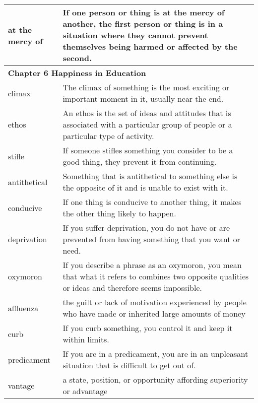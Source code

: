 \documentclass{article}
\begin{document}
\begin{center}
\begin{longtable}{|l|p{7.8cm}|}
\hline
at the mercy of
&
If one person or thing is at the mercy of another, the first person or thing is in a situation where they cannot prevent themselves being harmed or affected by the second.
\\

\hline
\multicolumn{2}{|l|}{\textbf{Chapter 6 Happiness in Education}}
\\
\hline
climax
&
The climax of something is the most exciting or important moment in it, usually near the end.
\\

\hline
ethos
&
An ethos is the set of ideas and attitudes that is associated with a particular group of people or a particular type of activity.
\\

\hline
stifle
&
If someone stifles something you consider to be a good thing, they prevent it from continuing.
\\

\hline
antithetical
&
Something that is antithetical to something else is the opposite of it and is unable to exist with it.
\\

\hline
conducive
&
If one thing is conducive to another thing, it makes the other thing likely to happen.
\\

\hline
deprivation
&
If you suffer deprivation, you do not have or are prevented from having something that you want or need.
\\

\hline
oxymoron
&
If you describe a phrase as an oxymoron, you mean that what it refers to combines two opposite qualities or ideas and therefore seems impossible.
\\

\hline
affluenza
&
the guilt or lack of motivation experienced by people who have made or inherited large amounts of money
\\

\hline
curb
&
If you curb something, you control it and keep it within limits.
\\

\hline
predicament
&
If you are in a predicament, you are in an unpleasant situation that is difficult to get out of.
\\

\hline
vantage
&
a state, position, or opportunity affording superiority or advantage
\\


\end{longtable}
\end{center}
\end{document}
